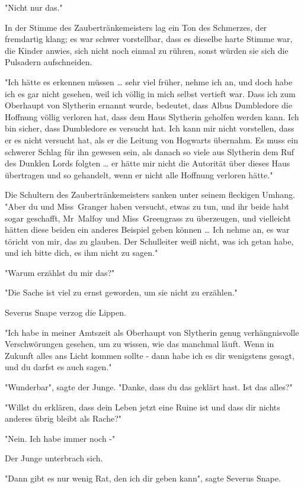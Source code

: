 {"Nicht nur das."

In der Stimme des Zaubertränkemeisters lag ein Ton des Schmerzes, der fremdartig klang; es war schwer vorstellbar, dass es dieselbe harte Stimme war, die Kinder anwies, sich nicht noch einmal zu rühren, sonst würden sie sich die Pulsadern aufschneiden.

"Ich hätte es erkennen müssen … sehr viel früher, nehme ich an, und doch habe ich es gar nicht gesehen, weil ich völlig in mich selbst vertieft war. Dass ich zum Oberhaupt von Slytherin ernannt wurde, bedeutet, dass Albus Dumbledore die Hoffnung völlig verloren hat, dass dem Haus Slytherin geholfen werden kann. Ich bin sicher, dass Dumbledore es versucht hat. Ich kann mir nicht vorstellen, dass er es nicht versucht hat, als er die Leitung von Hogwarts übernahm. Es muss ein schwerer Schlag für ihn gewesen sein, als danach so viele aus Slytherin dem Ruf des Dunklen Lords folgten … er hätte mir nicht die Autorität über dieses Haus übertragen und so gehandelt, wenn er nicht alle Hoffnung verloren hätte."

Die Schultern des Zaubertränkemeisters sanken unter seinem fleckigen Umhang. "Aber du und Miss~Granger haben versucht, etwas zu tun, und ihr beide habt sogar geschafft, Mr~Malfoy und Miss~Greengrass zu überzeugen, und vielleicht hätten diese beiden ein anderes Beispiel geben können … Ich nehme an, es war töricht von mir, das zu glauben. Der Schulleiter weiß nicht, was ich getan habe, und ich bitte dich, es ihm nicht zu sagen."

"Warum erzählst du mir das?"

"Die Sache ist viel zu ernst geworden, um sie nicht zu erzählen."

Severus Snape verzog die Lippen.

"Ich habe in meiner Amtszeit als Oberhaupt von Slytherin genug verhängnisvolle Verschwörungen gesehen, um zu wissen, wie das manchmal läuft. Wenn in Zukunft alles ans Licht kommen sollte - dann habe ich es dir wenigstens gesagt, und du darfst es auch sagen."

"Wunderbar", sagte der Junge. "Danke, dass du das geklärt hast. Ist das alles?"

"Willst du erklären, dass dein Leben jetzt eine Ruine ist und dass dir nichts anderes übrig bleibt als Rache?"

"Nein. Ich habe immer noch -"

Der Junge unterbrach sich.

"Dann gibt es nur wenig Rat, den ich dir geben kann", sagte Severus Snape.

}

